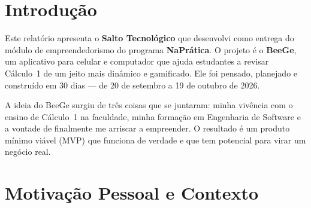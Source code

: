 \documentclass[12pt, a4paper]{article}
\begin{document}
\section{Introdu\c{c}\~{a}o}

Este relat\'{o}rio apresenta o \textbf{Salto Tecnol\'{o}gico} que desenvolvi como entrega do m\'{o}dulo de empreendedorismo do programa \textbf{NaPr\'{a}tica}. O projeto \'{e} o \textbf{BeeGe}, um aplicativo para celular e computador que ajuda estudantes a revisar C\'{a}lculo~1 de um jeito mais din\^{a}mico e gamificado. Ele foi pensado, planejado e constru\'{i}do em 30 dias --- de 20 de setembro a 19 de outubro de 2026.

A ideia do BeeGe surgiu de tr\^{e}s coisas que se juntaram: minha viv\^{e}ncia com o ensino de C\'{a}lculo~1 na faculdade, minha forma\c{c}\~{a}o em Engenharia de Software e a vontade de finalmente me arriscar a empreender. O resultado \'{e} um produto m\'{i}nimo vi\'{a}vel (MVP) que funciona de verdade e que tem potencial para virar um neg\'{o}cio real.

\section{Motiva\c{c}\~{a}o Pessoal e Contexto}
\end{document}

